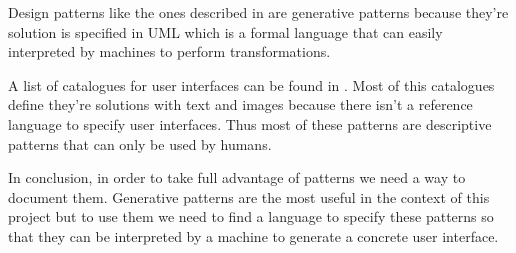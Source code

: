 Design patterns like the ones described in \cite{Design_Patterns} are generative patterns because they're solution is specified in UML which is a formal language that can easily interpreted by machines to perform transformations.

A list of catalogues for user interfaces can be found in \cite{The_Interaction_Design_Patterns_Page}. Most of this catalogues define they're solutions with text and images because there isn't a reference language to specify user interfaces. Thus most of these patterns are descriptive patterns that can only be used by humans.

In conclusion, in order to take full advantage of patterns we need a way to document them. Generative patterns are the most useful in the context of this project but to use them we need to find a language to specify these patterns so that they can be interpreted by a machine to generate a concrete user interface.